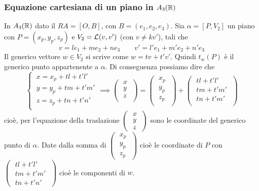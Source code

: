 \documentclass[twoside]{report}
\begin{document}
\begin{figure}[ht]
    \centering
    \def\svgwidth{160pt}
    \label{fig:simmetria-punto-retta}
\end{figure}

\subsubsection{Equazione cartesiana di un piano in \(A_3(\RR )\)}
In \(A_3(\RR )\) dato il \(RA = [O, B]\), con \(B = (e_1, e_2, e_3)\). Sia \(\alpha = [P, V_2]\) un piano con \(P = (x_p, y_p, z_p)\) e \(V_2 = \mathcal{L}(v, v') \) (con \(v \neq kv'\)), tali che  \[
v = le_1 + me_2 + ne_3 \qquad 
v' = l'e_1 + m'e_2 + n'e_3
\] 
Il generico vettore \(w \in V_2\) si scrive come \(w = tv + t' v'\). Quindi \(t_w(P)\) è il generico punto appartenente a \(\alpha \). Di conseguenza possiamo dire che \[
\begin{cases}
    \ x = x_p + tl + t'l' \\
    \ y = y_p + tm + t'm' \\
    \ z = z_p + tn + t'n' \\
\end{cases} \implies 
\left( \;
 \begin{matrix}
    x \\
    y \\
    z \\
\end{matrix} \;
 \right) =
\left( \;
 \begin{matrix}
    x_p \\
    y_p \\
    z_p \\
\end{matrix} \;
 \right) +
\left( \;
 \begin{matrix}
    tl + t'l' \\
    tm + t'm' \\
    tn + t'm' \\
\end{matrix} \;
 \right) 
\] cioè, per l'equazione della traslazione \(\left( \; \begin{matrix} x \\ y\\ z \end{matrix} \; \right) \) sono le coordinate del generico punto di \(\alpha \). Date dalla somma di \(\left( \; \begin{matrix} x_p \\ y_p\\ z_p \end{matrix} \; \right) \) cioè le coordinate di \(P\) con \(\left( \; \begin{matrix} tl + t'l' \\ tm + t'm'\\ tn + t'n' \end{matrix} \; \right) \) cioè le componenti di \(w\).
\end{document}
